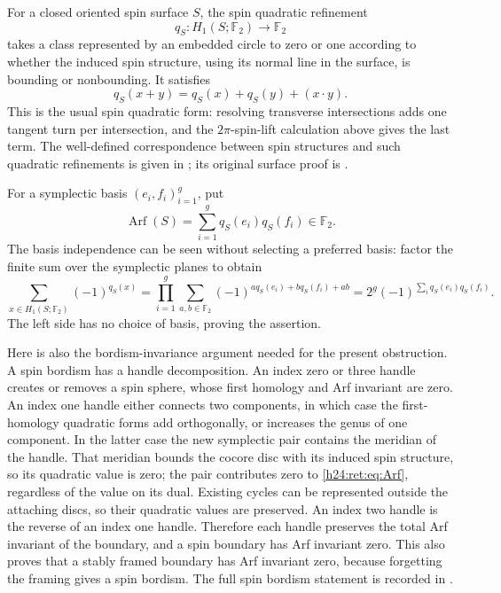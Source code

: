 For a closed oriented spin surface \(S\), the spin quadratic
refinement
\[
 q_S:H_1(S;\mathbb F_2)\longrightarrow\mathbb F_2
\]
takes a class represented by an embedded circle to zero or one
according to whether the induced spin structure, using its normal
line in the surface, is bounding or nonbounding.  It satisfies
\begin{equation}
 q_S(x+y)=q_S(x)+q_S(y)+(x\mathbin{\cdot}y).
 \label{h24:ret:eq:quadratic}
\end{equation}
This is the usual spin quadratic form: resolving transverse
intersections adds one tangent turn per intersection, and the
\(2\pi\)-spin-lift calculation above gives the last term.  The
well-defined correspondence between spin structures and such
quadratic refinements is given in
\cite[Theorem 3.2 and Remark 3.3]{h24:retbib:DebrayGunningham}; its original
surface proof is \cite{h24:retbib:Johnson}.

For a symplectic basis \((e_i,f_i)_{i=1}^g\), put
\begin{equation}
 \operatorname{Arf}(S)=\sum_{i=1}^gq_S(e_i)q_S(f_i)\in\mathbb F_2.
 \label{h24:ret:eq:Arf}
\end{equation}
The basis independence can be seen without selecting a preferred
basis: factor the finite sum over the symplectic planes to obtain
\[
 \sum_{x\in H_1(S;\mathbb F_2)}(-1)^{q_S(x)}
   =\prod_{i=1}^g
     \sum_{a,b\in\mathbb F_2}(-1)^{a q_S(e_i)+b q_S(f_i)+ab}
   =2^g(-1)^{\sum_i q_S(e_i)q_S(f_i)}.
\]
The left side has no choice of basis, proving the assertion.

Here is also the bordism-invariance argument needed for the present
obstruction.  A spin bordism has a handle decomposition.  An index
zero or three handle creates or removes a spin sphere, whose first
homology and Arf invariant are zero.  An index one handle either
connects two components, in which case the first-homology quadratic
forms add orthogonally, or increases the genus of one component.
In the latter case the new symplectic pair contains the meridian
of the handle.  That meridian bounds the cocore disc with its
induced spin structure, so its quadratic value is zero; the pair
contributes zero to \eqref{h24:ret:eq:Arf}, regardless of the value on its
dual.  Existing cycles can be represented outside the attaching
discs, so their quadratic values are preserved.  An index two
handle is the reverse of an index one handle.  Therefore each
handle preserves the total Arf invariant of the boundary, and a
spin boundary has Arf invariant zero.  This also proves that a
stably framed boundary has Arf invariant zero, because forgetting
the framing gives a spin bordism.  The full spin bordism statement
is recorded in \cite[Theorem 3.6]{h24:retbib:DebrayGunningham}.

